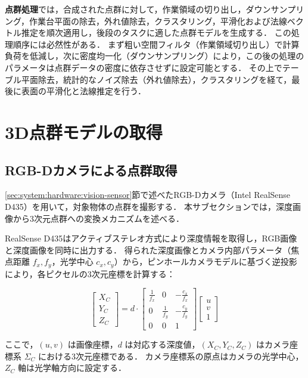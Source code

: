 \textbf{点群処理}では，合成された点群に対して，作業領域の切り出し，ダウンサンプリング，作業台平面の除去，外れ値除去，クラスタリング，平滑化および法線ベクトル推定を順次適用し，後段のタスクに適した点群モデルを生成する．
この処理順序には必然性がある．
まず粗い空間フィルタ（作業領域切り出し）で計算負荷を低減し，次に密度均一化（ダウンサンプリング）により，この後の処理のパラメータは点群データの密度に依存させずに設定可能とする．
その上でテーブル平面除去，統計的なノイズ除去（外れ値除去），クラスタリングを経て，最後に表面の平滑化と法線推定を行う．

\section{3D点群モデルの取得}
\label{sec:system:pointcloud:acquisition}

\subsection{RGB-Dカメラによる点群取得}
\label{sec:system:pointcloud:acquisition:rgbd}
\ref{sec:system:hardware:vision-sensor}節で述べたRGB-Dカメラ（Intel RealSense D435）を用いて，対象物体の点群を撮影する．
本サブセクションでは，深度画像から3次元点群への変換メカニズムを述べる．

RealSense D435はアクティブステレオ方式により深度情報を取得し，RGB画像と深度画像を同時に出力する．
得られた深度画像とカメラ内部パラメータ（焦点距離 $f_x, f_y$，光学中心 $c_x, c_y$）から，ピンホールカメラモデルに基づく逆投影により，各ピクセルの3次元座標を計算する：

\begin{equation}
  \begin{bmatrix} X_C \\ Y_C \\ Z_C \end{bmatrix}
  = d \cdot
  \begin{bmatrix}
    \frac{1}{f_x} & 0 & -\frac{c_x}{f_x} \\
    0 & \frac{1}{f_y} & -\frac{c_y}{f_y} \\
    0 & 0 & 1
  \end{bmatrix}
  \begin{bmatrix} u \\ v \\ 1 \end{bmatrix}
  \label{eq:system:back_projection}
\end{equation}

ここで，$(u, v)$ は画像座標，$d$ は対応する深度値，$(X_C, Y_C, Z_C)$ はカメラ座標系 $\Sigma_C$ における3次元座標である．
カメラ座標系の原点はカメラの光学中心，$Z_C$ 軸は光学軸方向に設定する．

